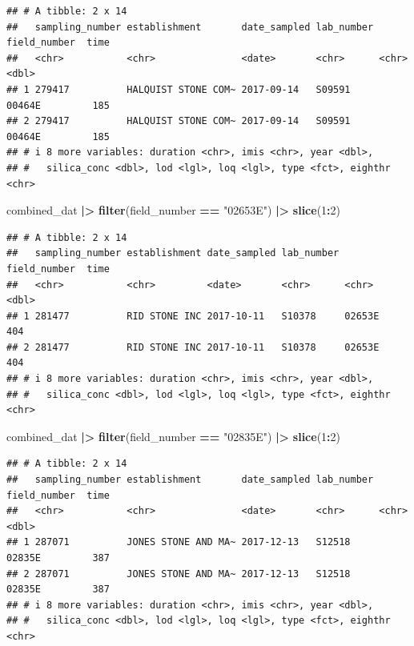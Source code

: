 \documentclass[
]{article}
\newenvironment{Shaded}{\begin{snugshade}}{\end{snugshade}}
\newcommand{\DecValTok}[1]{\textcolor[rgb]{0.00,0.00,0.81}{#1}}
\newcommand{\FunctionTok}[1]{\textcolor[rgb]{0.13,0.29,0.53}{\textbf{#1}}}
\newcommand{\NormalTok}[1]{#1}
\newcommand{\SpecialCharTok}[1]{\textcolor[rgb]{0.81,0.36,0.00}{\textbf{#1}}}
\newcommand{\StringTok}[1]{\textcolor[rgb]{0.31,0.60,0.02}{#1}}
\begin{document}
\begin{verbatim}
## # A tibble: 2 x 14
##   sampling_number establishment       date_sampled lab_number field_number  time
##   <chr>           <chr>               <date>       <chr>      <chr>        <dbl>
## 1 279417          HALQUIST STONE COM~ 2017-09-14   S09591     00464E         185
## 2 279417          HALQUIST STONE COM~ 2017-09-14   S09591     00464E         185
## # i 8 more variables: duration <chr>, imis <chr>, year <dbl>,
## #   silica_conc <dbl>, lod <lgl>, loq <lgl>, type <fct>, eighthr <chr>
\end{verbatim}

\begin{Shaded}
\begin{Highlighting}[]
\NormalTok{combined\_dat }\SpecialCharTok{|\textgreater{}} 
  \FunctionTok{filter}\NormalTok{(field\_number }\SpecialCharTok{==} \StringTok{"02653E"}\NormalTok{) }\SpecialCharTok{|\textgreater{}} 
  \FunctionTok{slice}\NormalTok{(}\DecValTok{1}\SpecialCharTok{:}\DecValTok{2}\NormalTok{)}
\end{Highlighting}
\end{Shaded}

\begin{verbatim}
## # A tibble: 2 x 14
##   sampling_number establishment date_sampled lab_number field_number  time
##   <chr>           <chr>         <date>       <chr>      <chr>        <dbl>
## 1 281477          RID STONE INC 2017-10-11   S10378     02653E         404
## 2 281477          RID STONE INC 2017-10-11   S10378     02653E         404
## # i 8 more variables: duration <chr>, imis <chr>, year <dbl>,
## #   silica_conc <dbl>, lod <lgl>, loq <lgl>, type <fct>, eighthr <chr>
\end{verbatim}

\begin{Shaded}
\begin{Highlighting}[]
\NormalTok{combined\_dat }\SpecialCharTok{|\textgreater{}} 
  \FunctionTok{filter}\NormalTok{(field\_number }\SpecialCharTok{==} \StringTok{"02835E"}\NormalTok{) }\SpecialCharTok{|\textgreater{}} 
  \FunctionTok{slice}\NormalTok{(}\DecValTok{1}\SpecialCharTok{:}\DecValTok{2}\NormalTok{)}
\end{Highlighting}
\end{Shaded}

\begin{verbatim}
## # A tibble: 2 x 14
##   sampling_number establishment       date_sampled lab_number field_number  time
##   <chr>           <chr>               <date>       <chr>      <chr>        <dbl>
## 1 287071          JONES STONE AND MA~ 2017-12-13   S12518     02835E         387
## 2 287071          JONES STONE AND MA~ 2017-12-13   S12518     02835E         387
## # i 8 more variables: duration <chr>, imis <chr>, year <dbl>,
## #   silica_conc <dbl>, lod <lgl>, loq <lgl>, type <fct>, eighthr <chr>
\end{verbatim}
\end{document}
